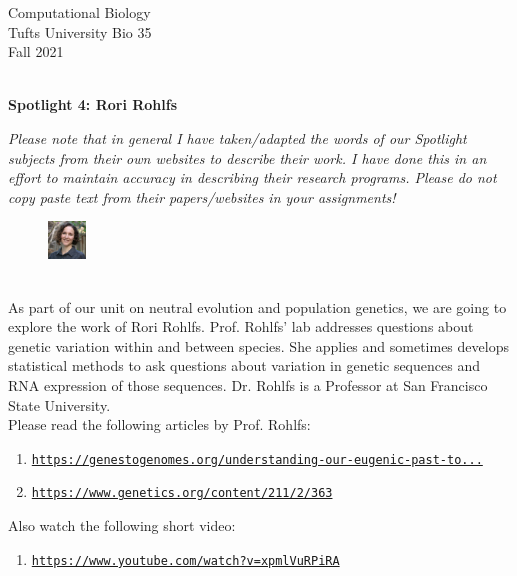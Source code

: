 \documentclass{article}
\begin{document}
\BeginAccSupp{}
\begin{flushright}
Computational Biology ~\\
Tufts University Bio 35 ~\\
Fall 2021 ~\\ ~\\
\end{flushright}
\begin{center}{\textbf{\Large{Spotlight 4: Rori Rohlfs}}}\end{center}

\textit{Please note that in general I have taken/adapted the words of our Spotlight subjects from their own websites to describe their work. I have done this in an effort to maintain accuracy in describing their research programs. Please do not copy paste text from their papers/websites in your assignments!}

\begin{figure}
\begin{center}
 \includegraphics[width=0.09\textwidth]{images/rori-rohlfs.jpg}
 \end{center}
\end{figure}
~\\ As part of our unit on neutral evolution and population genetics, we are going to explore the work of Rori Rohlfs. Prof. Rohlfs' lab addresses questions about genetic variation within and between species. She applies and sometimes develops statistical methods to ask questions about variation in genetic sequences and RNA expression of those sequences. Dr. Rohlfs is a Professor at San Francisco State University.
~\\

Please read the following articles by Prof. Rohlfs: 
\begin{enumerate}
\item \texttt{\href{https://genestogenomes.org/understanding-our-eugenic-past-to-take-steps-towards-scientific-accountability/}{https://genestogenomes.org/understanding-our-eugenic-past-to...}}
\item \texttt{\href{https://www.genetics.org/content/211/2/363}{https://www.genetics.org/content/211/2/363}}
\end{enumerate}

Also watch the following short video:
\begin{enumerate}
\item \texttt{\href{https://www.youtube.com/watch?v=xpmlVuRPiRA}{https://www.youtube.com/watch?v=xpmlVuRPiRA}}
\end{enumerate}
\end{document}
